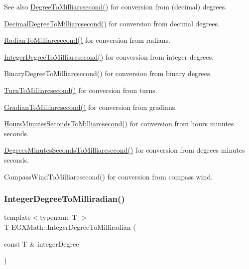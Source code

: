 \begin{DoxySeeAlso}{See also}
\mbox{\hyperlink{group___e_g_x_math-_angle_conversions-_degree_ga2c218e286b2ef72a00734dbc5a7f5ab6}{Degree\+To\+Milliarcsecond()}} for conversion from (decimal) degrees. 

\mbox{\hyperlink{group___e_g_x_math-_angle_conversions-_decimal_degree_gadb9ff3c92cf7484793f91e7de80c222e}{Decimal\+Degree\+To\+Milliarcsecond()}} for conversion from decimal degrees. 

\mbox{\hyperlink{group___e_g_x_math-_angle_conversions-_radian_ga84fbb494a455cfeb30be62776f96c9a9}{Radian\+To\+Milliarcsecond()}} for conversion from radians. 

\mbox{\hyperlink{group___e_g_x_math-_angle_conversions-_integer_degree_gadc43f22e832cd8fcf16b7bd2269ae348}{Integer\+Degree\+To\+Milliarcsecond()}} for conversion from integer degrees. 

Binary\+Degree\+To\+Milliarcsecond() for conversion from binary degrees. 

\mbox{\hyperlink{group___e_g_x_math-_angle_conversions-_turn_ga05d6fea8f8475831e93dd23f6196393f}{Turn\+To\+Milliarcsecond()}} for conversion from turns. 

\mbox{\hyperlink{group___e_g_x_math-_angle_conversions-_gradian_gad77ea0956413029f4166dce8d7f5ce83}{Gradian\+To\+Milliarcsecond()}} for conversion from gradians. 

\mbox{\hyperlink{group___e_g_x_math-_angle_conversions-_hours_minutes_seconds_gaf63c3ba5f75aacd268db2814575fa3f9}{Hours\+Minutes\+Seconds\+To\+Milliarcsecond()}} for conversion from hours minutes seconds. 

\mbox{\hyperlink{group___e_g_x_math-_angle_conversions-_degrees_minutes_seconds_gafc5f994dfc7cc26500ca978336484926}{Degrees\+Minutes\+Seconds\+To\+Milliarcsecond()}} for conversion from degrees minutes seconds. 

Compass\+Wind\+To\+Milliarcsecond() for conversion from compass wind. 
\end{DoxySeeAlso}
\mbox{\label{group___e_g_x_math-_angle_conversions-_integer_degree_ga5379a68bdff5cc4fab5bb1ba06ef9453}} 
\subsubsection{\texorpdfstring{Integer\+Degree\+To\+Milliradian()}{IntegerDegreeToMilliradian()}}
{\footnotesize\ttfamily template$<$typename T $>$ \\
T E\+G\+X\+Math\+::\+Integer\+Degree\+To\+Milliradian (\begin{DoxyParamCaption}\item[{const T \&}]{integer\+Degree }\end{DoxyParamCaption})}



